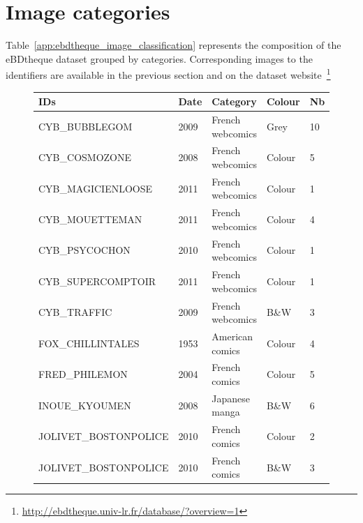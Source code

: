 
\section{Image categories}

Table~\ref{app:ebdtheque_image_classification} represents the composition of the eBDtheque dataset grouped by categories. 
Corresponding images to the identifiers are available in the previous section and on the dataset website~\footnote{\url{http://ebdtheque.univ-lr.fr/database/?overview=1}}


\begin{figure}[!ht]
	\begin{center}
	\begin{tabular}{|lllll|}
	\hline
	\textbf{IDs}                              & \textbf{Date} & \textbf{Category}         & \textbf{Colour}     & \textbf{Nb} \\
	\hline
	CYB\_BUBBLEGOM                         & 2009        & French webcomics & Grey & 10       \\
	CYB\_COSMOZONE                         & 2008        & French webcomics & Colour     & 5        \\
	CYB\_MAGICIENLOOSE                     & 2011        & French webcomics & Colour     & 1        \\
	CYB\_MOUETTEMAN                        & 2011        & French webcomics & Colour     & 4        \\
	CYB\_PSYCOCHON                         & 2010        & French webcomics & Colour     & 1        \\
	CYB\_SUPERCOMPTOIR                     & 2011        & French webcomics & Colour     & 1        \\
	CYB\_TRAFFIC                           & 2009        & French webcomics & B\&W       & 3        \\
	FOX\_CHILLINTALES                      & 1953        & American comics  & Colour     & 4        \\
	FRED\_PHILEMON                         & 2004        & French comics    & Colour     & 5        \\
	INOUE\_KYOUMEN                         & 2008        & Japanese manga   & B\&W       & 6        \\
	JOLIVET\_BOSTONPOLICE      & 2010        & French comics    & Colour     & 2        \\
	JOLIVET\_BOSTONPOLICE      & 2010        & French comics    & B\&W       & 3        \\

\end{tabular}
\end{center}
\end{figure}
